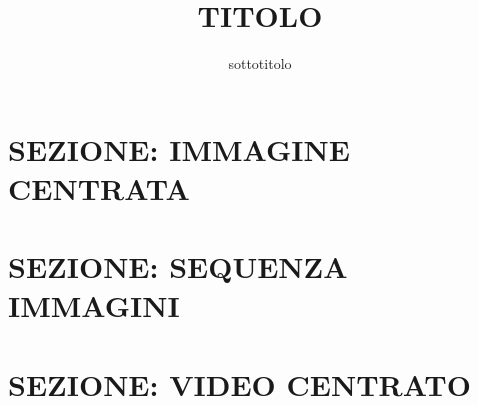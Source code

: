 \documentclass[aspectratio=1610]{beamer}
\title{TITOLO}
\subtitle{sottotitolo}
\date{}
\institute{\textit{
        Fonti:
        \begin{itemize}
            \item[-] \href{www.nomefonte1.it}{NOME FONTE 1}
            \item[-] \href{www.nomefonte2.it}{NOME FONTE 2}
        \end{itemize}
    }
}
\begin{document}
\begin{frame}
    \titlepage
\end{frame}

\section{SEZIONE: IMMAGINE CENTRATA}


\section{SEZIONE: SEQUENZA IMMAGINI}


\section{SEZIONE: VIDEO CENTRATO}

\end{document}
